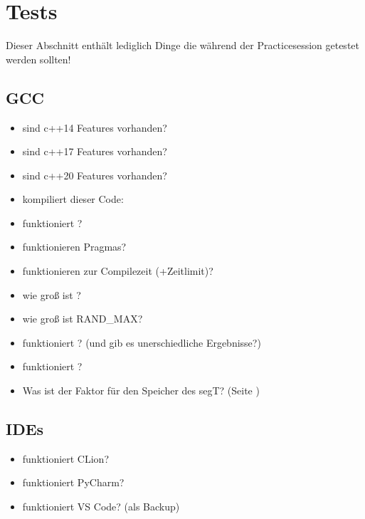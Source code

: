 \section{Tests}
Dieser Abschnitt enthält lediglich Dinge die während der Practicesession getestet werden sollten!

\subsection{GCC}
\begin{itemize}
	\item sind c++14 Features vorhanden?
	\item sind c++17 Features vorhanden?
	\item sind c++20 Features vorhanden?
	\item kompiliert dieser Code:
\end{itemize}
\begin{itemize}
	\item funktioniert ?
	\item funktionieren Pragmas?
	\item funktionieren  zur Compilezeit (+Zeitlimit)?
	\item wie groß ist ?
	\item wie groß ist RAND\_MAX?
	\item funktioniert ? (und gib es unerschiedliche Ergebnisse?)
	\item funktioniert ?
	\item Was ist der Faktor für den Speicher des segT? (Seite \pageref{segT})
\end{itemize}


\subsection{IDEs}
\begin{itemize}
	\item funktioniert CLion?
	\item funktioniert PyCharm?
	\item funktioniert VS Code? (als Backup)
\end{itemize}

